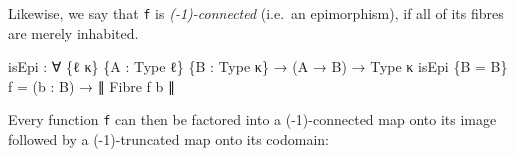 \documentclass[
  11pt,
  oneside,
  article]{memoir}
\newenvironment{Shaded}{}{}
\newcommand{\NormalTok}[1]{#1}
\newcommand{\OtherTok}[1]{\textcolor[rgb]{0.00,0.44,0.13}{#1}}
\theoremstyle{definition}
\theoremstyle{plain}
\newcommand{\0}{\textsf{0}}
\newcommand{\1}{\tn{\textsf{1}}}
\begin{document}
Likewise, we say that \texttt{f} is \emph{(-1)-connected} (i.e.~an
epimorphism), if all of its fibres are merely inhabited.

\begin{Shaded}
\begin{Highlighting}[]
\NormalTok{isEpi }\OtherTok{:} \OtherTok{∀} \OtherTok{\{}\NormalTok{ℓ κ}\OtherTok{\}} \OtherTok{\{}\NormalTok{A }\OtherTok{:}\NormalTok{ Type ℓ}\OtherTok{\}} \OtherTok{\{}\NormalTok{B }\OtherTok{:}\NormalTok{ Type κ}\OtherTok{\}} \OtherTok{→} \OtherTok{(}\NormalTok{A }\OtherTok{→}\NormalTok{ B}\OtherTok{)} \OtherTok{→}\NormalTok{ Type κ}
\NormalTok{isEpi }\OtherTok{\{}\NormalTok{B }\OtherTok{=}\NormalTok{ B}\OtherTok{\}}\NormalTok{ f }\OtherTok{=} \OtherTok{(}\NormalTok{b }\OtherTok{:}\NormalTok{ B}\OtherTok{)} \OtherTok{→}\NormalTok{ ∥ Fibre f b ∥}
\end{Highlighting}
\end{Shaded}

Every function \texttt{f} can then be factored into a (-1)-connected map
onto its image followed by a (-1)-truncated map onto its codomain:
\end{document}
